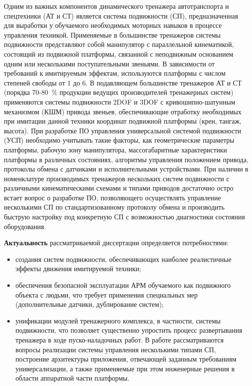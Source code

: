 {\actuality} Одним из важных компонентов динамического тренажера автотранспорта и спецтехники (АТ и СТ) является система подвижности (СП),
предназначенная для выработки у обучаемого необходимых моторных навыков в процессе управления техникой.
Применяемые в большинстве тренажеров системы подвижности представляют собой манипулятор с параллельной кинематикой,
состоящий из подвижной платформы, связанной с неподвижным основанием одним или несколькими поступательными звеньями.
В зависимости от требований к имитируемым эффектам, используются платформы с числом степеней свободы от 1 до 6.
В подавляющем большинстве тренажеров АТ и СТ (порядка 70-80~\% продукции ведущих производителей тренажерных систем) применяются системы подвижности
2DOF и 3DOF с кривошипно-шатунным механизмом (КШМ) привода звеньев, обеспечивающие отработку необходимых при имитации данной техники
координат подвижной платформы (крен, тангаж, высота).
При разработке ПО управления универсальной системой подвижности (УСП) необходимо учитывать такие факторы, как геометрические параметры
платформы, рабочую зону манипулятора, массогабаритные характеристики платформы в различных состояниях,
алгоритмы управления положением привода, протоколы обмена с датчиками и исполнительными устройствами.
При наличии в номенклатуре производимых тренажеров нескольких систем подвижности с различными кинематическими схемами и типами приводов
достаточно остро встает вопрос о разработке ПО, позволяющего осуществлять управление несколькими СП по стандартизованному протоколу обмена
и производить быструю настройку под конкретную СП с возможностью диагностики состояния оборудования.

 \textbf{Актуальность} рассматриваемой диссертации определяется потребностями:
\begin{itemize}
	\item создания систем подвижности, обеспечивающих наиболее реалистичные эффекты движения имитируемой техники;
	\item обеспечения безопасной эксплуатации АРМ обучаемого как подвижного объекта с людьми, что требует применения специальных мер (дополнительные датчики, дублирование систем);
	\item унификации модулей тренажерного комплекса, в частности, системы подвижности, что позволяет существенно упростить процесс развертывания тренажера в ходе пуско-наладочных работ.
В работе рассматриваются вопросы реализации системы управления несколькими типами СП, построение архитектуры приложения, отвечающей заданным требованиям универсализации, а также применяемые при этом инженерные решения в области аппаратной части платформы.
\end{itemize}

